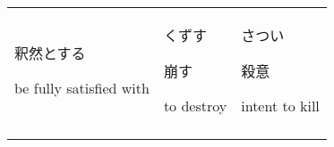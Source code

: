 \documentclass[12pt, a4j, landscape, dvipdfmx]{utarticle}
\begin{document}
\begin{minipage}[t][0pt]{\linewidth }
\begin{tabular}{||p{5.5cm}||p{5.5cm}||p{5.5cm}||}
            \rule{0pt}{3ex} \hspace*{.4cm} {\small
            釈然とする}\newline \rule{0pt}{3ex} \hspace*{.425cm}
            {\small be fully satisfied with}&\rule{0pt}{3ex}
            \hspace*{-.4cm} {\LARGE くずす}\newline
            \rule{0pt}{3ex} \hspace*{.4cm} {\small
            崩す}\newline \rule{0pt}{3ex} \hspace*{.425cm}
            {\small to destroy}&\rule{0pt}{3ex}
            \hspace*{-.4cm} {\LARGE さつい}\newline
            \rule{0pt}{3ex} \hspace*{.4cm} {\small
            殺意}\newline \rule{0pt}{3ex} \hspace*{.425cm}
            {\small intent to kill}\tabularnewline
            \hhline{|b:=:b:=:b:=:b|} 
        \end{tabular} 
    \end{minipage} 
\end{document}

